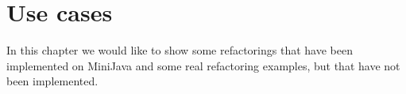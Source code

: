\section{Use cases}

In this chapter we would like to show some refactorings that have been implemented on MiniJava and some real refactoring examples, but that have not been implemented.





